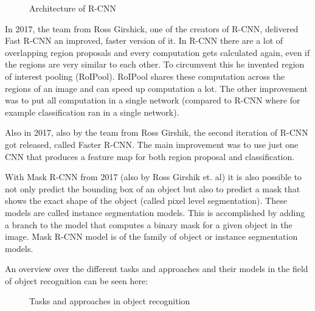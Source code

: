 \begin{figure}[!h]
	\caption{\label{fig:input-image} Architecture of R-CNN}
\end{figure}

In 2017, the team from Ross Girshick, one of the creators of R-CNN, delivered Fast R-CNN an improved, faster version of it. In R-CNN there are a lot of overlapping region proposals and every computation gets calculated again, even if the regions are very similar to each other. To circumvent this he invented region of interest pooling (RoIPool). RoIPool shares these computation across the regions of an image and can speed up computation a lot. The other improvement was to put all computation in a single network (compared to R-CNN where for example classification ran in a single network).

Also in 2017, also by the team from Ross Girshik, the second iteration of R-CNN got released, called Faster R-CNN. The main improvement was to use just one CNN that produces a feature map for both region proposal and classification.

With Mask R-CNN from 2017 (also by Ross Girshik et. al) it is also possible to not only predict the bounding box of an object but also to predict a mask that shows the exact shape of the object (called pixel level segmentation). These models are called instance segmentation models. This is accomplished by adding a branch to the model that computes a binary mask for a given object in the image. Mask R-CNN model is of the family of object or instance segmentation models.

An overview over the different tasks and approaches and their models  in the field of object recognition can be seen here:

\begin{figure}[!h]
	\caption{\label{fig:input-image} Tasks and approaches in object recognition}
\end{figure}

